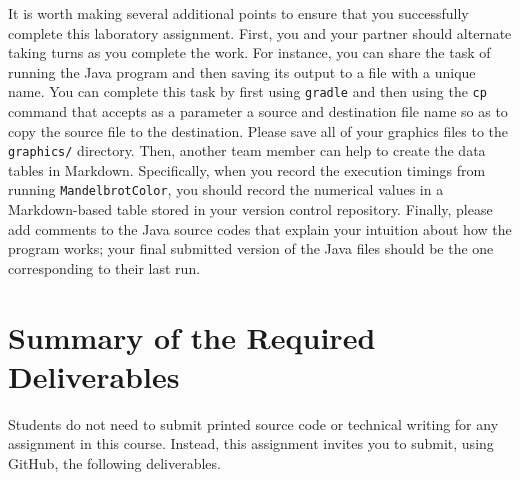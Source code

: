 \documentclass[11pt]{article}
\newcommand{\secondprogram}{\lstinline{MandelbrotColor}}
\newcommand{\command}[1]{``\lstinline{#1}''}
\newcommand{\program}[1]{\lstinline{#1}}
\begin{document}
It is worth making several additional points to ensure that you successfully complete this laboratory assignment. First,
you and your partner should alternate taking turns as you complete the work. For instance, you can share the task of
running the Java program and then saving its output to a file with a unique name. You can complete this task by first
using \program{gradle} and then using the \program{cp} command that accepts as a parameter a source and destination file
name so as to copy the source file to the destination. Please save all of your graphics files to the \program{graphics/}
directory. Then, another team member can help to create the data tables in Markdown. Specifically, when you record the
execution timings from running \secondprogram{}, you should record the numerical values in a Markdown-based table stored
in your version control repository. Finally, please add comments to the Java source codes that explain your intuition
about how the program works; your final submitted version of the Java files should be the one corresponding to their
last run.



\section*{Summary of the Required Deliverables}

\noindent Students do not need to submit printed source code or technical writing for any assignment in this course.
Instead, this assignment invites you to submit, using GitHub, the following deliverables.
\end{document}
